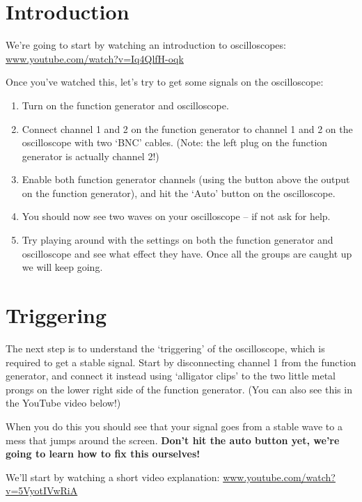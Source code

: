 \documentclass[12pt, letterpaper]{article}
\begin{document}
\normalsize

\section{Introduction}

We're going to start by watching an introduction to oscilloscopes:\\
\href{https://www.youtube.com/watch?v=Iq4QlfH-oqk}{www.youtube.com/watch?v=Iq4QlfH-oqk}

Once you've watched this, let's try to get some signals on the oscilloscope:
\begin{enumerate}
	\item Turn on the function generator and oscilloscope.
	\item Connect channel 1 and 2 on the function generator to channel 1 and 2 on the oscilloscope with two `BNC' cables.  (Note: the left plug on the function generator is actually channel 2!)
	\item Enable both function generator channels (using the button above the output on the function generator), and hit the `Auto' button on the oscilloscope.
	\item You should now see two waves on your oscilloscope -- if not ask for help.
	\item Try playing around with the settings on both the function generator and oscilloscope and see what effect they have.  Once all the groups are caught up we will keep going.
\end{enumerate}

\section{Triggering}
The next step is to understand the `triggering' of the oscilloscope, which is required to get a stable signal.
Start by disconnecting channel 1 from the function generator, and connect it instead using `alligator clips' to the two little metal prongs on the lower right side of the function generator.  (You can also see this in the YouTube video below!)

When you do this you should see that your signal goes from a stable wave to a mess that jumps around the screen.
\textbf{Don't hit the auto button yet, we're going to learn how to fix this ourselves!}

We'll start by watching a short video explanation:
\href{https://www.youtube.com/watch?v=5VyotIVwRiA}{www.youtube.com/watch?v=5VyotIVwRiA}
\end{document}
